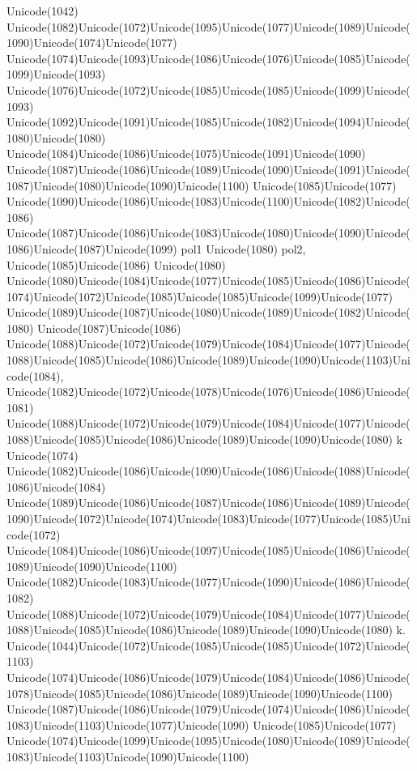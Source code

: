 \documentclass[a4paper,11pt]{report}
\begin{document}
{{{\begin{Verbatim}[commandchars=!@|,fontsize=\small,frame=single,label=Пример]
\end{Verbatim}
 Unicode(1042)
Unicode(1082)Unicode(1072)Unicode(1095)Unicode(1077)Unicode(1089)Unicode(1090)Unicode(1074)Unicode(1077)
Unicode(1074)Unicode(1093)Unicode(1086)Unicode(1076)Unicode(1085)Unicode(1099)Unicode(1093)
Unicode(1076)Unicode(1072)Unicode(1085)Unicode(1085)Unicode(1099)Unicode(1093)
Unicode(1092)Unicode(1091)Unicode(1085)Unicode(1082)Unicode(1094)Unicode(1080)Unicode(1080)
Unicode(1084)Unicode(1086)Unicode(1075)Unicode(1091)Unicode(1090)
Unicode(1087)Unicode(1086)Unicode(1089)Unicode(1090)Unicode(1091)Unicode(1087)Unicode(1080)Unicode(1090)Unicode(1100)
Unicode(1085)Unicode(1077)
Unicode(1090)Unicode(1086)Unicode(1083)Unicode(1100)Unicode(1082)Unicode(1086)
Unicode(1087)Unicode(1086)Unicode(1083)Unicode(1080)Unicode(1090)Unicode(1086)Unicode(1087)Unicode(1099)
pol1 Unicode(1080) pol2, Unicode(1085)Unicode(1086) Unicode(1080)
Unicode(1080)Unicode(1084)Unicode(1077)Unicode(1085)Unicode(1086)Unicode(1074)Unicode(1072)Unicode(1085)Unicode(1085)Unicode(1099)Unicode(1077)
Unicode(1089)Unicode(1087)Unicode(1080)Unicode(1089)Unicode(1082)Unicode(1080)
Unicode(1087)Unicode(1086)
Unicode(1088)Unicode(1072)Unicode(1079)Unicode(1084)Unicode(1077)Unicode(1088)Unicode(1085)Unicode(1086)Unicode(1089)Unicode(1090)Unicode(1103)Unicode(1084),
Unicode(1082)Unicode(1072)Unicode(1078)Unicode(1076)Unicode(1086)Unicode(1081)
Unicode(1088)Unicode(1072)Unicode(1079)Unicode(1084)Unicode(1077)Unicode(1088)Unicode(1085)Unicode(1086)Unicode(1089)Unicode(1090)Unicode(1080)
k Unicode(1074)
Unicode(1082)Unicode(1086)Unicode(1090)Unicode(1086)Unicode(1088)Unicode(1086)Unicode(1084)
Unicode(1089)Unicode(1086)Unicode(1087)Unicode(1086)Unicode(1089)Unicode(1090)Unicode(1072)Unicode(1074)Unicode(1083)Unicode(1077)Unicode(1085)Unicode(1072)
Unicode(1084)Unicode(1086)Unicode(1097)Unicode(1085)Unicode(1086)Unicode(1089)Unicode(1090)Unicode(1100)
Unicode(1082)Unicode(1083)Unicode(1077)Unicode(1090)Unicode(1086)Unicode(1082)
Unicode(1088)Unicode(1072)Unicode(1079)Unicode(1084)Unicode(1077)Unicode(1088)Unicode(1085)Unicode(1086)Unicode(1089)Unicode(1090)Unicode(1080)
k.
Unicode(1044)Unicode(1072)Unicode(1085)Unicode(1085)Unicode(1072)Unicode(1103)
Unicode(1074)Unicode(1086)Unicode(1079)Unicode(1084)Unicode(1086)Unicode(1078)Unicode(1085)Unicode(1086)Unicode(1089)Unicode(1090)Unicode(1100)
Unicode(1087)Unicode(1086)Unicode(1079)Unicode(1074)Unicode(1086)Unicode(1083)Unicode(1103)Unicode(1077)Unicode(1090)
Unicode(1085)Unicode(1077)
Unicode(1074)Unicode(1099)Unicode(1095)Unicode(1080)Unicode(1089)Unicode(1083)Unicode(1103)Unicode(1090)Unicode(1100)
}}}
\end{document}
